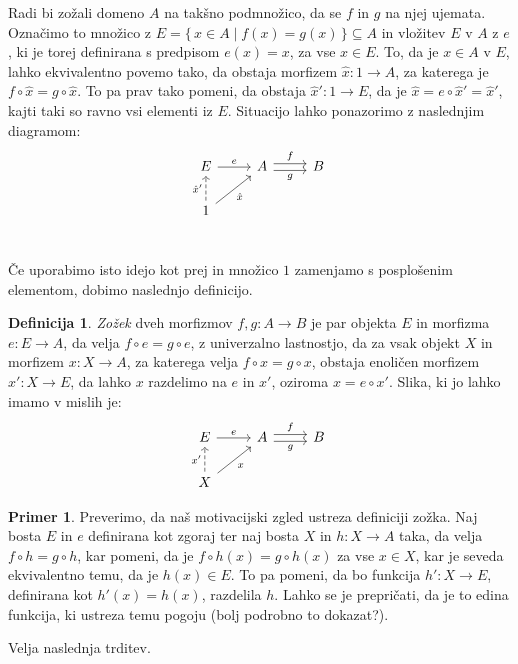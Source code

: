 \documentclass[12pt,a4paper]{book}
\theoremstyle{definition}
\newtheorem{definicija}{Definicija}[chapter]
\theoremstyle{plain}
\theoremstyle{definition}
\newtheorem{primer}{Primer}[section]
\theoremstyle{remark}
\renewcommand{\set}[1]{\{\,#1\,\}}
\begin{document}
Radi bi zožali domeno $A$ na takšno podmnožico, da se $f$ in $g$ na njej ujemata. Označimo to množico z $E = \set{x \in A \mid f(x) = g(x)} \subseteq A$ in vložitev $E$ v $A$ z $e$, ki je torej definirana s predpisom $e(x) = x$, za vse $x \in E$. To, da je $x \in A$ v $E$, lahko ekvivalentno povemo tako, da obstaja morfizem $\hat{x} : 1 \to A$, za katerega je $f \circ \hat{x} = g \circ \hat{x}$. To pa prav tako pomeni, da obstaja $\hat{x}' : 1 \to E$, da je $\hat{x} = e \circ \hat{x}' = \hat{x}'$, kajti taki so ravno vsi elementi iz $E$. Situacijo lahko ponazorimo z naslednjim diagramom:
$$\begin{tikzcd}
E \ar[r, "e"] & A \ar[r, shift left, "f"] \ar[r, shift right, "g"'] & B \\
1 \ar[u, dashed, "\hat{x}'"] \ar[ur, "\hat{x}"'] \\
\end{tikzcd}$$

Če uporabimo isto idejo kot prej in množico $1$ zamenjamo s posplošenim elementom, dobimo naslednjo definicijo.

\begin{definicija}
\emph{Zožek} dveh morfizmov $f, g : A \to B$ je par objekta $E$ in morfizma $e : E \to A$, da velja $f \circ e = g \circ e$, z univerzalno lastnostjo, da za vsak objekt $X$ in morfizem $x : X \to A$, za katerega velja $f \circ x = g \circ x$, obstaja enoličen morfizem $x' : X \to E$, da lahko $x$ razdelimo na $e$ in $x'$, oziroma $x = e \circ x'$.
Slika, ki jo lahko imamo v mislih je:
$$\begin{tikzcd}
E \ar[r, "e"] & A \ar[r, shift left, "f"] \ar[r, shift right, "g"'] & B \\
X \ar[u, dashed, "x'"] \ar[ur, "x"']
\end{tikzcd}$$

\end{definicija}

\begin{primer}
Preverimo, da naš motivacijski zgled ustreza definiciji zožka. Naj bosta $E$ in $e$ definirana kot zgoraj ter naj bosta $X$ in $h:X \to A$ taka, da velja $f \circ h = g \circ h$, kar pomeni, da je $f \circ h(x) = g \circ  h(x)$ za vse $x \in X$, kar je seveda ekvivalentno temu, da je $h(x) \in E$. To pa pomeni, da bo funkcija $h' : X \to E$, definirana kot $h'(x) = h(x)$, razdelila $h$. Lahko se je prepričati, da je to edina funkcija, ki ustreza temu pogoju (bolj podrobno to dokazat?).
\end{primer}

Velja naslednja trditev.
\end{document}
